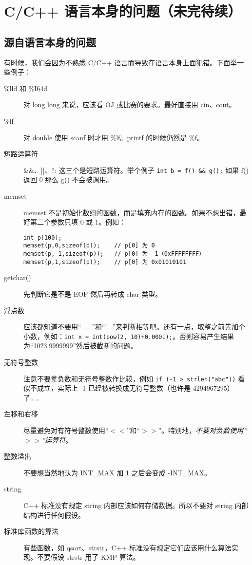 \section{C/C++ 语言本身的问题（未完待续）}
	\subsection{源自语言本身的问题}
		
		有时候，我们会因为不熟悉 C/C++ 语言而导致在语言本身上面犯错。下面举一些例子：
		
		\begin{description}
			\item[\%lld 和 \%I64d] 对 long long 来说，应该看 OJ 或比赛的要求。最好直接用 cin、cout。
			\item[\%lf] 对 double 使用 scanf 时才用 \%lf。printf 的时候仍然是 \%f。
			\item[短路运算符] \&\&、||、?: 这三个是短路运算符。举个例子 \lstinline|int b = f() && g();| 如果 f() 返回 0 那么 g() 不会被调用。
			\item[memset] memset 不是初始化数组的函数，而是填充内存的函数。如果不想出错，最好第二个参数只填 0 或 1。例如：
			
\begin{lstlisting}
int p[100];
memset(p,0,sizeof(p));    // p[0] 为 0
memset(p,-1,sizeof(p));   // p[0] 为 -1（0xFFFFFFFF）
memset(p,1,sizeof(p));    // p[0] 为 0x01010101
\end{lstlisting}
	
			\item[getchar()] 先判断它是不是 EOF 然后再转成 char 类型。
			\item[浮点数] 应该都知道不要用“==”和“!=”来判断相等吧。还有一点，取整之前先加个小数，例如：\lstinline|int x = int(pow(2, 10)+0.0001);|。否则容易产生结果为“1023.9999999”然后被截断的问题。
			\item[无符号整数] 注意不要拿负数和无符号整数作比较，例如 \lstinline|if (-1 > strlen("abc"))| 看似不成立，实际上 -1 已经被转换成无符号整数（也许是 4294967295）了……
			\item[左移和右移] 尽量避免对有符号整数使用“$<<$”和“$>>$”。特别地，\emph{不要对负数使用“$>>$”运算符}。
			\item[整数溢出] 不要想当然地认为 INT\_{}MAX 加 1 之后会变成 -INT\_{}MAX。
			\item[string] C++ 标准没有规定 string 内部应该如何存储数据。所以不要对 string 内部结构进行任何假设。
			\item[标准库函数的算法] 有些函数，如 qsort、strstr，C++ 标准没有规定它们应该用什么算法实现。不要假设 strstr 用了 KMP 算法。
		\end{description}
	
